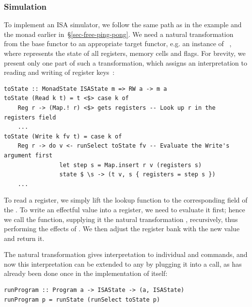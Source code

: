 \subsubsection{Simulation}

To implement an ISA simulator, we follow the same path as in the 
example and the  monad earlier in~\S\ref{sec-free-ping-pong}. We need a
natural transformation from the base functor  to an appropriate target
functor, e.g. an instance of ~, where 
represents the state of all registers, memory cells and flags. For brevity, we
present only one part of such a transformation, which assigns an interpretation
to reading and writing of register keys~:

\vspace{1mm}
\begin{verbatim}
toState :: MonadState ISAState m => RW a -> m a
toState (Read k t) = t <$> case k of
    Reg r -> (Map.! r) <$> gets registers -- Look up r in the registers field
    ...
toState (Write k fv t) = case k of
    Reg r -> do v <- runSelect toState fv -- Evaluate the Write's argument first
                let step s = Map.insert r v (registers s)
                state $ \s -> (t v, s { registers = step s })
    ...
\end{verbatim}
\vspace{1mm}

\noindent
To read a register, we simply lift the lookup function  to the
corresponding field of the . To write an effectful value 
into a register, we need to evaluate it first; hence we call the 
function, supplying it the natural transformation , recursively,
thus performing the effects of . We then adjust the register bank with
the new value and return it.

The natural transformation  gives interpretation to individual
 and  commands, and now this interpretation can be extended
to any  by plugging it into a  call, as has already
been done once in the implementation of  itself:

\vspace{1mm}
\begin{verbatim}
runProgram :: Program a -> ISAState -> (a, ISAState)
runProgram p = runState (runSelect toState p)
\end{verbatim}

